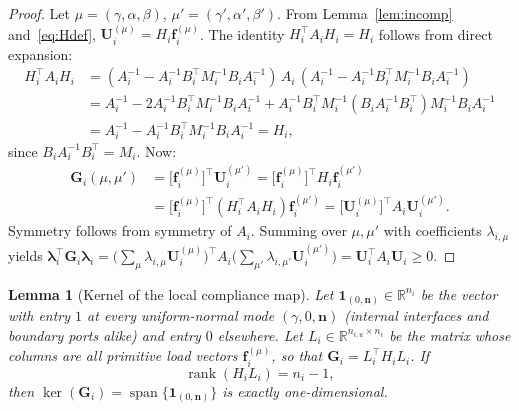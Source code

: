 \documentclass[11pt,a4paper]{article}
\newtheorem{lemma}{Lemma}[section]
\newcommand{\R}{\mathbb{R}}
\newcommand{\normal}{\bm{n}}
\newcommand{\trac}{\bm{\lambda}}
\newcommand{\DtN}{\mathbf{G}}
\newcommand{\one}{\mathbf{1}}
\newcommand{\loadvec}{\bm{f}}
\newcommand{\respvel}{\mathbf{U}}
\begin{document}
\begin{proof}
  Let $\mu = (\gamma,\alpha,\beta)$, $\mu' = (\gamma',\alpha',\beta')$.
  From Lemma~\ref{lem:incomp} and~\eqref{eq:Hdef},
  $\respvel_i^{(\mu)} = H_i \loadvec_i^{(\mu)}$.
  The identity $H_i^\top A_i H_i = H_i$ follows from direct expansion:
  \begin{align*}
    H_i^\top A_i H_i
    &= (A_i^{-1} - A_i^{-1}B_i^\top M_i^{-1}B_i A_i^{-1})\,A_i\,
       (A_i^{-1} - A_i^{-1}B_i^\top M_i^{-1}B_i A_i^{-1}) \\
    &= A_i^{-1} - 2A_i^{-1}B_i^\top M_i^{-1}B_i A_i^{-1}
       + A_i^{-1}B_i^\top M_i^{-1}(B_i A_i^{-1}B_i^\top)M_i^{-1}B_i A_i^{-1}\\
    &= A_i^{-1} - A_i^{-1}B_i^\top M_i^{-1}B_i A_i^{-1}
     = H_i,
  \end{align*}
  since $B_i A_i^{-1} B_i^\top = M_i$.  Now:
  \begin{align*}
    \DtN_i(\mu,\mu')
    &= \bigl[\loadvec_i^{(\mu)}\bigr]^\top \respvel_i^{(\mu')}
     = \bigl[\loadvec_i^{(\mu)}\bigr]^\top H_i \loadvec_i^{(\mu')} \\
    &= \bigl[\loadvec_i^{(\mu)}\bigr]^\top (H_i^\top A_i H_i)
       \loadvec_i^{(\mu')}
     = \bigl[\respvel_i^{(\mu)}\bigr]^\top A_i \respvel_i^{(\mu')}.
  \end{align*}
  Symmetry follows from symmetry of $A_i$.
  Summing over $\mu,\mu'$ with coefficients $\lambda_{i,\mu}$ yields
  $\trac_i^\top \DtN_i \trac_i
   = \bigl(\sum_\mu \lambda_{i,\mu}\respvel_i^{(\mu)}\bigr)^\top
     A_i \bigl(\sum_{\mu'}\lambda_{i,\mu'}\respvel_i^{(\mu')}\bigr)
   = \respvel_i^\top A_i \respvel_i \ge 0$.
\end{proof}


\begin{lemma}[Kernel of the local compliance map]\label{lem:kernel}
  Let $\one_{(0,\normal)} \in \R^{n_i}$ be the vector with entry $1$ at
  every uniform-normal mode $(\gamma,0,\normal)$ (internal interfaces and
  boundary ports alike) and entry $0$ elsewhere.
  Let $L_i \in \R^{n_{i,u} \times n_i}$ be the matrix whose columns are
  all primitive load vectors $\loadvec_i^{(\mu)}$, so that
  $\DtN_i = L_i^\top H_i L_i$.
  If
  \begin{equation}\label{eq:rank-assumption}
    \operatorname{rank}(H_i L_i) = n_i - 1,
  \end{equation}
  then $\ker(\DtN_i) = \operatorname{span}\{\one_{(0,\normal)}\}$ is exactly
  one-dimensional.
\end{lemma}
\end{document}
